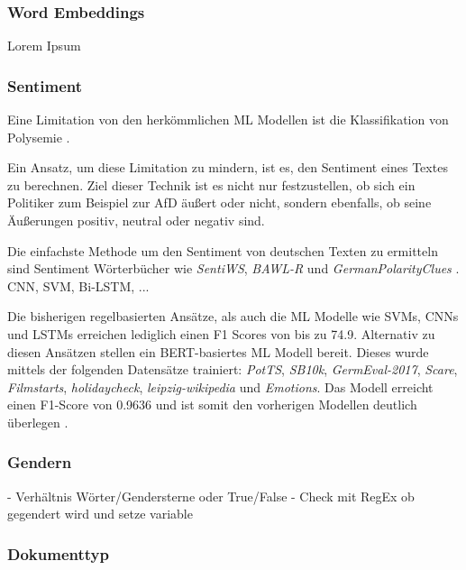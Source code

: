 \subsubsection{Word Embeddings}

Lorem Ipsum

\subsubsection{Sentiment}

Eine Limitation von den herkömmlichen \ac{ML} Modellen ist die Klassifikation von Polysemie \autocite[48\psq]{kowsari_text_2019}. 


Ein Ansatz, um diese Limitation zu mindern, ist es, den Sentiment eines Textes zu berechnen. Ziel dieser Technik ist es nicht nur festzustellen, ob sich ein Politiker zum Beispiel zur \ac{AfD} äußert oder nicht, sondern ebenfalls, ob seine Äußerungen positiv, neutral oder negativ sind.


Die einfachste Methode um den Sentiment von deutschen Texten zu ermitteln sind Sentiment Wörterbücher wie \textit{SentiWS}, \textit{BAWL-R} und \textit{GermanPolarityClues} \autocite[1627\psq]{guhr_training_2020}. CNN, SVM, Bi-LSTM, ...

Die bisherigen regelbasierten Ansätze, als auch die \ac{ML} Modelle wie \acp{SVM}, \acp{CNN} und \acp{LSTM} erreichen lediglich einen F1 Scores von bis zu \num{74.9}. Alternativ zu diesen Ansätzen stellen \textcite{guhr_training_2020} ein \ac{BERT}-basiertes \ac{ML} Modell bereit. Dieses wurde mittels der folgenden Datensätze trainiert: \textit{PotTS}, \textit{SB10k}, \textit{GermEval-2017}, \textit{Scare}, \textit{Filmstarts}, \textit{holidaycheck}, \textit{leipzig-wikipedia} und \textit{Emotions}. Das Modell erreicht einen F1-Score von \num{0.9636} und ist somit den vorherigen Modellen deutlich überlegen \autocite[1631]{guhr_training_2020}.

\subsubsection{Gendern}

- Verhältnis Wörter/Gendersterne oder True/False
- Check mit RegEx ob gegendert wird und setze variable

\subsubsection{Dokumenttyp}

